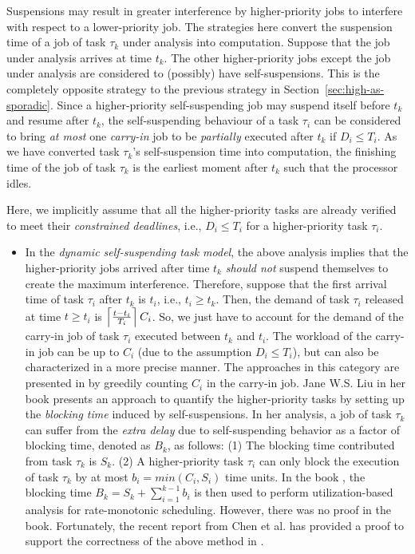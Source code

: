 \begin{table}[t]
\begin{table}[t]
 Suspensions may result in greater interference by higher-priority jobs to interfere with  respect to a lower-priority job. The strategies here convert the suspension time of a job of task $\tau_k$ under analysis into computation. Suppose that the job under analysis arrives at time $t_k$. The other higher-priority jobs except the job under analysis are considered to (possibly) have self-suspensions. This is the completely opposite strategy to the previous strategy in Section~\ref{sec:high-as-sporadic}. Since a higher-priority self-suspending job may suspend itself before $t_k$ and resume after $t_k$, the self-suspending behaviour of a task $\tau_i$ can be considered to bring \emph{at most} one \emph{carry-in} job to be \emph{partially} executed after $t_k$ if $D_i \leq T_i$. As we have converted task $\tau_k$'s self-suspension time into computation, the finishing time of the job of task $\tau_k$ is the earliest moment after $t_k$ such that the processor idles. 


Here, we implicitly assume that all the higher-priority tasks are already verified to meet their \emph{constrained deadlines}, i.e., $D_i \leq T_i$ for a higher-priority task $\tau_i$.
\begin{itemize}
\item In the \emph{dynamic self-suspending task model}, the above analysis implies that the higher-priority jobs arrived after time $t_k$ \emph{should not} suspend themselves to create the maximum interference. Therefore, suppose that the first arrival time of task $\tau_i$ after $t_k$ is $t_i$, i.e., $t_i \geq t_k$. Then, the demand of task $\tau_i$ released at time $t \geq t_i$ is $\left\lceil{\frac{t-t_i}{T_i} }\right\rceil C_i$. So, we just have to account for the demand of the carry-in job of task $\tau_i$ executed between $t_k$ and $t_i$. The workload of the carry-in job can be up to $C_i$ (due to the assumption $D_i \leq T_i$), but can also be characterized in a more precise manner. The approaches in this category are presented in \cite{huangpass:dac2015,LiuChen:rtss2014} by greedily counting $C_i$ in the carry-in job. 
Jane W.S. Liu in her book \cite[Page 164-165]{Liu:2000:RS:518501} presents an approach to quantify the higher-priority tasks by setting up the \emph{blocking time} induced by self-suspensions. In her analysis, a job of task $\tau_k$ can suffer from the \emph{extra delay} due to self-suspending behavior as a factor of blocking time, denoted as $B_k$, as follows: (1) The blocking time contributed from task $\tau_k$ is $S_k$. (2) A higher-priority task $\tau_i$ can only block the execution of task $\tau_k$ by at most $b_i=min(C_i, S_i)$ time units. In the book \cite{Liu:2000:RS:518501}, the blocking time $B_k=S_k+\sum_{i=1}^{k-1} b_i$ is then used to perform utilization-based analysis for rate-monotonic scheduling. However, there was no proof in the book. Fortunately, the recent report from Chen et al. \cite{ChenHuangNelissen} has provided a proof to support the correctness of the above method in \cite[Page 164-165]{Liu:2000:RS:518501}.


\end{itemize}
\end{table}
\end{table}
